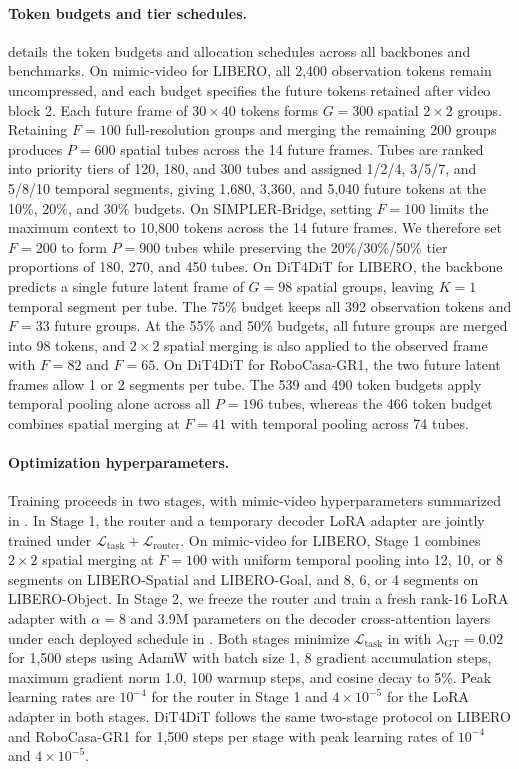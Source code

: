 \paragraph{Token budgets and tier schedules.}
     details the token budgets and allocation schedules across all backbones and benchmarks.
    On mimic-video for LIBERO, all 2,400 observation tokens remain uncompressed, and each budget specifies the future tokens retained after video block 2.
    Each future frame of $30\times 40$ tokens forms $G=300$ spatial $2\times 2$ groups.
    Retaining $F=100$ full-resolution groups and merging the remaining 200 groups produces $P=600$ spatial tubes across the 14 future frames.
    Tubes are ranked into priority tiers of 120, 180, and 300 tubes and assigned 1/2/4, 3/5/7, and 5/8/10 temporal segments, giving 1,680, 3,360, and 5,040 future tokens at the 10\%, 20\%, and 30\% budgets.
    On SIMPLER-Bridge, setting $F=100$ limits the maximum context to 10,800 tokens across the 14 future frames.
    We therefore set $F=200$ to form $P=900$ tubes while preserving the 20\%/30\%/50\% tier proportions of 180, 270, and 450 tubes.
    On DiT4DiT for LIBERO, the backbone predicts a single future latent frame of $G=98$ spatial groups, leaving $K=1$ temporal segment per tube.
    The 75\% budget keeps all 392 observation tokens and $F=33$ future groups.
    At the 55\% and 50\% budgets, all future groups are merged into 98 tokens, and $2\times 2$ spatial merging is also applied to the observed frame with $F=82$ and $F=65$.
    On DiT4DiT for RoboCasa-GR1, the two future latent frames allow 1 or 2 segments per tube.
    The 539 and 490 token budgets apply temporal pooling alone across all $P=196$ tubes, whereas the 466 token budget combines spatial merging at $F=41$ with temporal pooling across 74 tubes.

\paragraph{Optimization hyperparameters.}
    Training proceeds in two stages, with mimic-video hyperparameters summarized in .
    In Stage 1, the router and a temporary decoder LoRA adapter are jointly trained under $\mathcal{L}_{\mathrm{task}} + \mathcal{L}_{\mathrm{router}}$.
    On mimic-video for LIBERO, Stage 1 combines $2\times 2$ spatial merging at $F=100$ with uniform temporal pooling into 12, 10, or 8 segments on LIBERO-Spatial and LIBERO-Goal, and 8, 6, or 4 segments on LIBERO-Object.
    In Stage 2, we freeze the router and train a fresh rank-16 LoRA adapter with $\alpha=8$ and 3.9M parameters on the decoder cross-attention layers under each deployed schedule in .
    Both stages minimize $\mathcal{L}_{\mathrm{task}}$ in  with $\lambda_{\mathrm{GT}}=0.02$ for 1,500 steps using AdamW with batch size 1, 8 gradient accumulation steps, maximum gradient norm 1.0, 100 warmup steps, and cosine decay to 5\%.
    Peak learning rates are $10^{-4}$ for the router in Stage 1 and $4\times 10^{-5}$ for the LoRA adapter in both stages.
    DiT4DiT follows the same two-stage protocol on LIBERO and RoboCasa-GR1 for 1,500 steps per stage with peak learning rates of $10^{-4}$ and $4\times 10^{-5}$.

